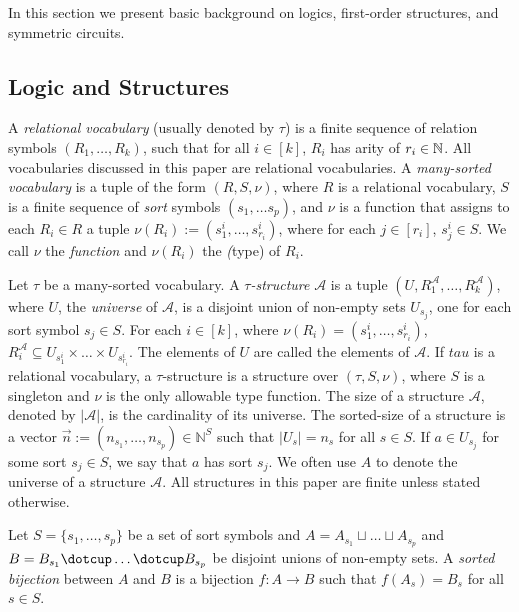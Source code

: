 \documentclass[../paper.tex]{subfiles}
\begin{document}
In this section we present basic background on logics, first-order structures,
and symmetric circuits.

\subsection{Logic and Structures}
A \emph{relational vocabulary} (usually denoted by $\tau$) is a finite sequence
of relation symbols $(R_1, \ldots, R_k)$, such that for all $i \in [k]$, $R_i$
has arity of $r_i \in \mathbb{N}$. All vocabularies discussed in this paper are
relational vocabularies. A \emph{many-sorted vocabulary} is a tuple of the form
$(R, S, \nu)$, where $R$ is a relational vocabulary, $S$ is a finite sequence of
\emph{sort} symbols $(s_1, \ldots s_p)$, and $\nu$ is a function that assigns to
each $R_i \in R$ a tuple $\nu(R_i) := (s^i_1, \ldots, s^i_{r_i})$, where for
each $j \in [r_i]$, $s^i_j \in S$. We call $\nu$ the \emph{\type function} and
$\nu(R_i)$ the \emph(type) of $R_i$.

Let $\tau$ be a many-sorted vocabulary. A \emph{$\tau$-structure} $\mathcal{A}$
is a tuple $(U , R^{\mathcal{A}}_1 , \ldots , R^{\mathcal{A}}_k )$, where $U$,
the \emph{universe} of $\mathcal{A}$, is a disjoint union of non-empty sets
$U_{s_j}$, one for each sort symbol $s_j \in S$. For each $i \in [k]$, where
$\nu(R_i) = (s^i_1 , \ldots , s^i_{r_i})$, $R^{\mathcal{A}}_i \subseteq
U_{s^i_1} \times \ldots \times U_{s^i_{r_i}}$. The elements of $U$ are called
the elements of $\mathcal{A}$. If $tau$ is a relational vocabulary, a
$\tau$-structure is a structure over $(\tau, S, \nu)$, where $S$ is a singleton
and $\nu$ is the only allowable type function. The size of a structure
$\mathcal{A}$, denoted by $\vert \mathcal{A} \vert$, is the cardinality of its
universe. The sorted-size of a structure is a vector $\vec{n} := (n_{s_1},
\ldots , n_{s_p}) \in \mathbb{N}^{S}$ such that $\vert U_{s} \vert = n_{s}$ for
all $s \in S$. If $a \in U_{s_j}$ for some sort $s_j \in S$, we say that $a$ has
sort $s_j$. We often use $A$ to denote the universe of a structure
$\mathcal{A}$. All structures in this paper are finite unless stated otherwise.

\begin{definition}
  Let $S = \{s_1, \ldots , s_p\}$ be a set of sort symbols and $A = A_{s_1}
  \sqcup \ldots \sqcup A_{s_p}$ and $B = B_{s_1}\dotcup \ldots \dotcup
  B_{s_p}$ be disjoint unions of non-empty sets. A \emph{sorted bijection}
  between $A$ and $B$ is a bijection $f: A \rightarrow B$ such that $f (A_s) =
  B_s$ for all $s \in S$.
\end{definition}
\end{document}
